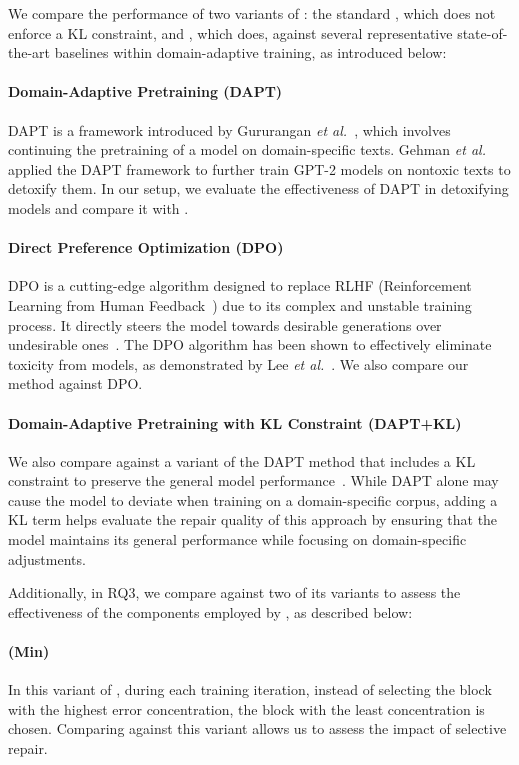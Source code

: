 We compare the performance of two variants of \nick: the standard \nick, which does not enforce a KL constraint, and \nickkl, which does, against several representative state-of-the-art baselines within domain-adaptive training, as introduced below:


\paragraph{Domain-Adaptive Pretraining (DAPT)} DAPT is a framework introduced by Gururangan \textit{et al.}~\cite{gururangan2020don}, which involves continuing the pretraining of a model on domain-specific texts. Gehman \textit{et al.}~\cite{gehman2020realtoxicityprompts} applied the DAPT framework to further train GPT-2 models on nontoxic texts to detoxify them. In our setup, we evaluate the effectiveness of DAPT in detoxifying models and compare it with \nick.

\paragraph{Direct Preference Optimization (DPO)} DPO is a cutting-edge algorithm designed to replace RLHF (Reinforcement Learning from Human Feedback~\cite{ouyang2022training}) due to its complex and unstable training process. It directly steers the model towards desirable generations over undesirable ones~\cite{rafailov2024direct}. The DPO algorithm has been shown to effectively eliminate toxicity from models, as demonstrated by Lee \textit{et al.}~\cite{lee2024mechanistic}. We also compare our method against DPO.


\paragraph{Domain-Adaptive Pretraining with KL Constraint (DAPT+KL)}
We also compare \nick against a variant of the DAPT method that includes a KL constraint to preserve the general model performance~\cite{liu2023chain}. While DAPT alone may cause the model to deviate when training on a domain-specific corpus, adding a KL term helps evaluate the repair quality of this approach by ensuring that the model maintains its general performance while focusing on domain-specific adjustments.

Additionally, in RQ3, we compare \nick against two of its variants to assess the effectiveness of the components employed by \nick, as described below:

\paragraph{\nick (Min)} In this variant of \nick, during each training iteration, instead of selecting the block with the highest error concentration, the block with the least concentration is chosen. Comparing \nick against this variant allows us to assess the impact of selective repair.


